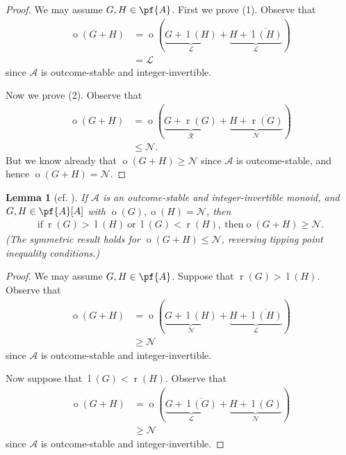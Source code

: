 \documentclass[11pt]{article}
\newtheorem{lemma}[theorem]{Lemma}
\theoremstyle{definition}
\DeclareMathOperator{\outcome}{o}
\newcommand{\set}[1]{\mathcal{#1}}
\DeclareMathOperator{\ltp}{l}
\DeclareMathOperator{\rtp}{r}
\begin{document}
\begin{proof}
    We may assume $G,H\in\pf{A}$. First we prove (1). Observe that
    \begin{align*}
        \outcome(G+H)&=
        \outcome(\underbrace{G+\ltp(H)}_{\mathscr{L}}+
        \underbrace{H+\overline{\ltp(H)}}_{\mathscr{L}})\\
                     &=\mathscr{L}
    \end{align*}
    since $\set{A}$ is outcome-stable and integer-invertible.

    Now we prove (2). Observe that
    \begin{align*}
        \outcome(G+H)&=
        \outcome(\underbrace{G+\rtp(G)}_{\mathscr{R}}+
        \underbrace{H+\overline{\rtp(G)}}_{\mathscr{N}})\\
                     &\leq\mathscr{N}.
    \end{align*}
    But we know already that $\outcome(G+H)\geq\mathscr{N}$ since $\set{A}$ is
    outcome-stable, and hence $\outcome(G+H)=\mathscr{N}$.
\end{proof}

\begin{lemma}[cf. {\cite[Lemma 13 on p.~8]{milley.renault:invertible}}]
    \label{lem:13}
    If $\set{A}$ is an outcome-stable and integer-invertible monoid, and
    $G,H\in\pf{A}[A]$ with $\outcome(G),\outcome(H)=\mathscr{N}$, then
    \begin{align*}
        \mathrm{if~}\rtp(G)>\ltp(H)\mathrm{~or~}\ltp(G)<\rtp(H)\mathrm{,~then}
        \outcome(G+H)\geq\mathscr{N}.
    \end{align*}
    (The symmetric result holds for $\outcome(G+H)\leq\mathscr{N}$, reversing
    tipping point inequality conditions.)
\end{lemma}

\begin{proof}
    We may assume $G,H\in\pf{A}$. Suppose that $\rtp(G)>\ltp(H)$. Observe that
    \begin{align*}
        \outcome(G+H)&=
        \outcome(\underbrace{G+\ltp(H)}_{\mathscr{N}}+
        \underbrace{H+\overline{\ltp(H)}}_{\mathscr{L}})\\
                     &\geq\mathscr{N}
    \end{align*}
    since $\set{A}$ is outcome-stable and integer-invertible.

    Now suppose that $\ltp(G)<\rtp(H)$. Observe that
    \begin{align*}
        \outcome(G+H)&=
        \outcome(\underbrace{G+\overline{\ltp(G)}}_{\mathscr{L}}+
        \underbrace{H+\ltp(G)}_{\mathscr{N}})\\
                     &\geq\mathscr{N}
    \end{align*}
    since $\set{A}$ is outcome-stable and integer-invertible.
\end{proof}
\end{document}
